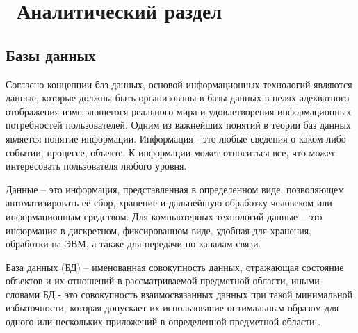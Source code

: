 \chapter{ Аналитический раздел }

\section{Базы данных}
Согласно концепции баз данных, основой информационных технологий являются данные, которые должны быть организованы в базы данных в целях адекватного отображения изменяющегося реального мира и удовлетворения информационных потребностей пользователей. Одним из важнейших понятий в теории баз данных является понятие информации. Информация - это любые сведения о каком-либо событии, процессе, объекте. К информации может относиться все, что может интересовать пользователя любого уровня.

Данные -- это информация, представленная в определенном виде, позволяющем автоматизировать её сбор, хранение и дальнейшую обработку человеком или информационным средством. Для компьютерных технологий данные -- это информация в дискретном, фиксированном виде, удобная для хранения, обработки на ЭВМ, а также для передачи по каналам связи. 

База данных (БД) -- именованная совокупность данных, отражающая состояние объектов и их отношений в рассматриваемой предметной области, иными словами БД - это совокупность взаимосвязанных данных при такой минимальной избыточности, которая допускает их использование оптимальным образом для одного или нескольких приложений в определенной предметной области \cite{sql}.

